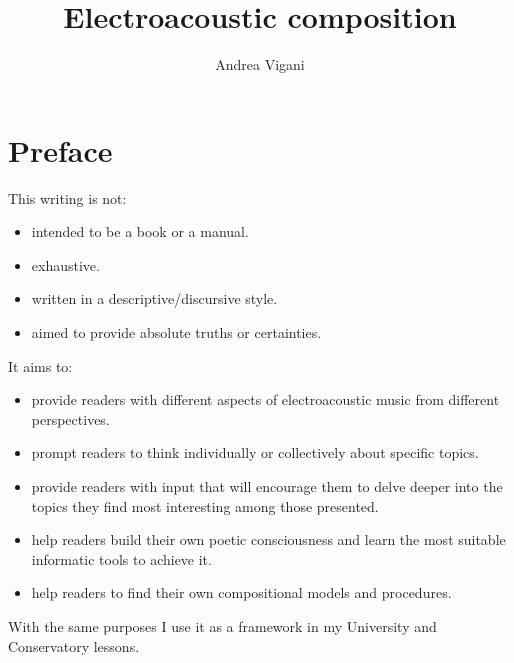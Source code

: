 \documentclass[a4paper,11pt]{book}
\providecommand{\tightlist}{\setlength{\itemsep}{0pt}
                               \setlength{\parskip}{0pt}}
\begin{document}
\author{Andrea Vigani}
\title{Electroacoustic composition}
\maketitle


\chapter*{Preface}\label{prefazione}

This writing is not: 
\begin{itemize}
\tightlist
\item intended to be a book or a manual.
\item exhaustive.
\item written in a descriptive/discursive style.
\item aimed to provide absolute truths or certainties.
\end{itemize}

It aims to:
\begin{itemize}
\tightlist
\item provide readers with different aspects of electroacoustic music from different perspectives.
\item prompt readers to think individually or collectively about specific topics.
\item provide readers with input that will encourage them to delve deeper into the topics they find most interesting among those presented.
\item help readers build their own poetic consciousness and learn the most suitable informatic tools to achieve it.
\item help readers to find their own compositional models and procedures.
\end{itemize}

With the same purposes I use it as a framework in my University and Conservatory lessons.

\tableofcontents







\lstlistoflistings
\end{document}
